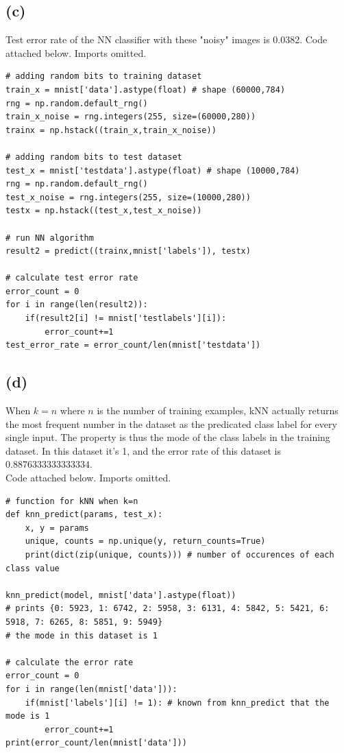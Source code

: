 \documentclass[11pt]{article}
\begin{document}
\subsection{(c)}
Test error rate of the NN classifier with these "noisy" images is 0.0382. Code attached below. Imports omitted.
\begin{verbatim}
# adding random bits to training dataset
train_x = mnist['data'].astype(float) # shape (60000,784)
rng = np.random.default_rng()
train_x_noise = rng.integers(255, size=(60000,280))
trainx = np.hstack((train_x,train_x_noise))

# adding random bits to test dataset
test_x = mnist['testdata'].astype(float) # shape (10000,784)
rng = np.random.default_rng()
test_x_noise = rng.integers(255, size=(10000,280))
testx = np.hstack((test_x,test_x_noise))

# run NN algorithm
result2 = predict((trainx,mnist['labels']), testx)

# calculate test error rate
error_count = 0
for i in range(len(result2)):
    if(result2[i] != mnist['testlabels'][i]):
        error_count+=1
test_error_rate = error_count/len(mnist['testdata'])
\end{verbatim}

\subsection{(d)}
When $k=n$ where $n$ is the number of training examples, kNN actually returns the most frequent number in the dataset as the predicated class label for every single input. The property is thus the mode of the class labels in the training dataset. In this dataset it's 1, and the error rate of this dataset is $0.8876333333333334$.\\
Code attached below. Imports omitted.
\begin{verbatim}
# function for kNN when k=n
def knn_predict(params, test_x):
    x, y = params
    unique, counts = np.unique(y, return_counts=True)
    print(dict(zip(unique, counts))) # number of occurences of each class value

knn_predict(model, mnist['data'].astype(float))
# prints {0: 5923, 1: 6742, 2: 5958, 3: 6131, 4: 5842, 5: 5421, 6: 5918, 7: 6265, 8: 5851, 9: 5949}
# the mode in this dataset is 1

# calculate the error rate
error_count = 0
for i in range(len(mnist['data'])):
    if(mnist['labels'][i] != 1): # known from knn_predict that the mode is 1
        error_count+=1
print(error_count/len(mnist['data']))
\end{verbatim}
\end{document}
